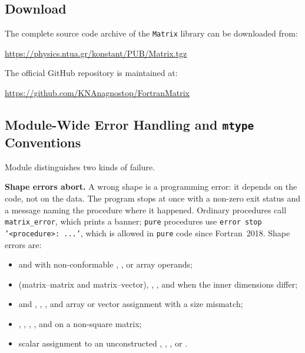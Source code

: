 \subsection{Download}
\label{subsec:download}

The complete source code archive of the \texttt{Matrix} library can be downloaded from:
\begin{center}
  \url{https://physics.ntua.gr/konstant/PUB/Matrix.tgz}
\end{center}
The official GitHub repository is maintained at:
\begin{center}
  \url{https://github.com/KNAnagnostop/FortranMatrix}
\end{center}

\subsection{Module-Wide Error Handling and \texorpdfstring{\texttt{mtype}}{mtype} Conventions}
\label{subsec:error_mtype}

Module  distinguishes two kinds of failure.

\textbf{Shape errors abort.} A wrong shape is a programming error: it depends on the code, not on the data. The program stops at once with a non-zero exit status and a message naming the procedure where it happened. Ordinary procedures call \texttt{matrix\_error}, which prints a banner; \texttt{pure} procedures use \texttt{error stop '<procedure>: ...'}, which is allowed in \texttt{pure} code since Fortran~2018. Shape errors are:
\begin{itemize}
  \item \procname{+} and \procname{-} with non-conformable , , or array operands;
  \item \procname{*} (matrix--matrix and matrix--vector), , , and  when the inner dimensions differ;
  \item {} and  \procname{+}, \procname{-}, , and array or vector assignment with a size mismatch;
  \item {}, , , , and  on a non-square matrix;
  \item scalar assignment to an unconstructed , , , or .
\end{itemize}

